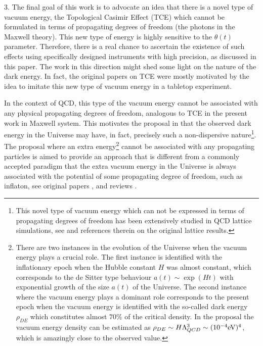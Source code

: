 \documentclass[ twocolumn,aps,prd,   
               preprintnumbers,numbers,sort&compress,nofootinbib,
                            showpacs,superscriptaddress,
               colorlinks,
               linkcolor=blue,   
               citecolor=blue]{revtex4-1}   \newcommand{\exclude}[1]{}
\begin{document}
            3. The final  goal   of this work is to advocate  an idea that there is a novel type of vacuum energy, the Topological Casimir Effect (TCE) which cannot be formulated in terms of propagating degrees of freedom (the photons in the Maxwell theory). This new type of energy is highly sensitive to the $\theta (t)$ parameter.
            Therefore, there is a real chance to ascertain the existence of such effects using specifically designed    instruments with  high  precision,  as discussed in this paper.  The work in this direction  might shed some light on the nature of the dark energy. In fact, the original papers   \cite{Cao:2013na,Cao:2015uza} on TCE were  mostly  motivated  by the idea to imitate  this new type of vacuum energy in a tabletop experiment. 
             
            In the context of QCD,  this type of the   vacuum energy cannot be   associated with   any physical propagating degrees of freedom, analogous to TCE in  the present work in Maxwell system.  This motivates the proposal  in  \cite{Zhitnitsky:2013pna, Zhitnitsky:2015dia}  that the  observed dark  energy in  the Universe may have, in fact,  precisely such a non-dispersive  nature\footnote{This novel type  of vacuum energy which can not be expressed in terms of propagating degrees of freedom has been extensively studied in QCD lattice simulations, see \cite{Zhitnitsky:2013pna} and references therein on the original lattice results.}. The proposal where an
             extra energy\footnote{There are two instances in the evolution of the Universe when the vacuum energy plays a crucial  role.
The first instance   is identified with  the inflationary epoch  when the Hubble constant $H$ was almost constant, which corresponds to the de Sitter type behaviour $a(t)\sim \exp(Ht)$ with exponential growth of the size $a(t)$ of the Universe. The  second instance where the vacuum energy plays a dominant role  corresponds to the present epoch when the vacuum energy is identified with the so-called dark energy $\rho_{DE}$ which constitutes almost $70\%$ of the critical density. In the proposal  \cite{Zhitnitsky:2013pna,Zhitnitsky:2015dia}  the vacuum energy density can be estimated as $\rho_{DE}\sim H\Lambda^3_{QCD}\sim (10^{-4}{\rm  eV})^4$, which is amazingly  close to the observed value.}  cannot be associated with any propagating particles is aimed to provide an approach that is different from a commonly accepted paradigm that the extra vacuum energy in the Universe is always associated with the potential of some  propagating degree of freedom, 
            such as inflaton, see original papers \cite{inflation1,inflation2}, and reviews \cite{linde, mukhanov}.
            
\end{document}
